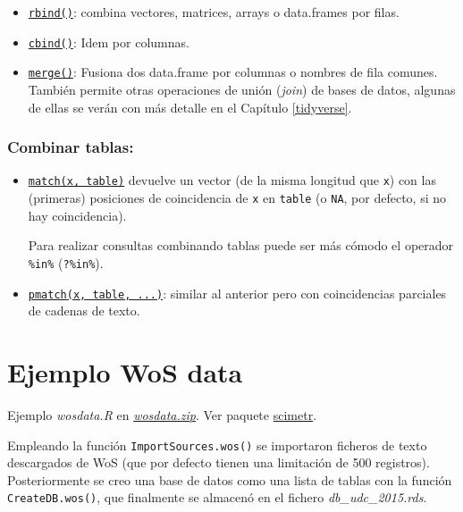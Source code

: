 \documentclass[
]{book}
\theoremstyle{break}
\theoremstyle{nonumberplain}
\begin{document}
\begin{itemize}
\item
  \href{https://www.rdocumentation.org/packages/base/versions/3.6.1/topics/rbind}{\texttt{rbind()}}: combina vectores, matrices, arrays o data.frames por filas.
\item
  \href{https://www.rdocumentation.org/packages/base/versions/3.6.1/topics/cbind}{\texttt{cbind()}}: Idem por columnas.
\item
  \href{https://www.rdocumentation.org/packages/base/versions/3.6.1/topics/merge}{\texttt{merge()}}: Fusiona dos data.frame por columnas o nombres de fila comunes. También permite otras operaciones de unión (\emph{join}) de bases de datos, algunas de ellas se verán con más detalle en el Capítulo \ref{tidyverse}.
\end{itemize}

\subsubsection{Combinar tablas:}\label{combinar-tablas}

\begin{itemize}
\item
  \href{https://www.rdocumentation.org/packages/base/versions/3.6.1/topics/match}{\texttt{match(x,\ table)}} devuelve un vector (de la misma longitud que \texttt{x}) con las (primeras) posiciones de coincidencia de \texttt{x} en \texttt{table} (o \texttt{NA}, por defecto, si no hay coincidencia).

  Para realizar consultas combinando tablas puede ser más cómodo el operador \texttt{\%in\%} (\texttt{?\textquotesingle{}\%in\%\textquotesingle{}}).
\item
  \href{https://www.rdocumentation.org/packages/base/versions/3.6.1/topics/pmatch}{\texttt{pmatch(x,\ table,\ ...)}}: similar al anterior pero con coincidencias parciales de cadenas de texto.
\end{itemize}

\section{Ejemplo WoS data}\label{ejemplo-wos-data}

Ejemplo \emph{wosdata.R} en \href{data/wosdata.zip}{\emph{wosdata.zip}}.
Ver paquete \href{https://rubenfcasal.github.io/scimetr/articles/scimetr.html}{scimetr}.

Empleando la función \texttt{ImportSources.wos()} se importaron ficheros de texto descargados de WoS (que por defecto tienen una limitación de 500 registros).
Posteriormente se creo una base de datos como una lista de tablas con la función \texttt{CreateDB.wos()},
que finalmente se almacenó en el fichero \emph{db\_udc\_2015.rds}.
\end{document}
